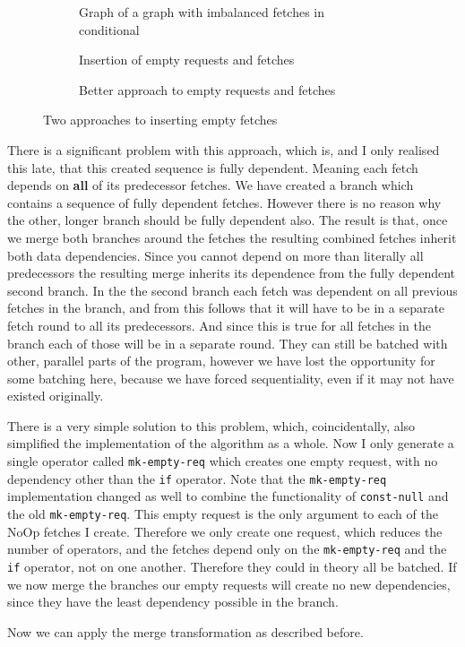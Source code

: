 \begin{figure}[h]
  \begin{subfigure}{\textwidth}
      \caption{Graph of a graph with imbalanced fetches in conditional}
      \label{fig:if-insert-empty-parallel-before}
  \end{subfigure}
  \begin{subfigure}[b]{0.5\textwidth}
      \caption{Insertion of empty requests and fetches}
      \label{fig:if-insert-empty-parallel-after}
  \end{subfigure}
  \begin{subfigure}[b]{.5\textwidth}
      \caption{Better approach to empty requests and fetches}
      \label{if-insert-empty-better-after-insert}
  \end{subfigure}
  \caption{Two approaches to inserting empty fetches}
\end{figure}


There is a significant problem with this approach, which is, and I only realised this late, that this created sequence is fully dependent.
Meaning each fetch depends on \textbf{all} of its predecessor fetches.
We have created a branch which contains a sequence of fully dependent fetches.
However there is no reason why the other, longer branch should be fully dependent also.
The result is that, once we merge both branches around the fetches the resulting combined fetches inherit both data dependencies.
Since you cannot depend on more than literally all predecessors the resulting merge inherits its dependence from the fully dependent second branch.
In the the second branch each fetch was dependent on all previous fetches in the branch, and from this follows that it will have to be in a separate fetch round to all its predecessors.
And since this is true for all fetches in the branch each of those will be in a separate round.
They can still be batched with other, parallel parts of the program, however we have lost the opportunity for some batching here, because we have forced sequentiality, even if it may not have existed originally.

There is a very simple solution to this problem, which, coincidentally, also simplified the implementation of the algorithm as a whole.
Now I only generate a single operator called \texttt{mk-empty-req} which creates one empty request, with no dependency other than the \texttt{if} operator.
Note that the \texttt{mk-empty-req} implementation changed as well to combine the functionality of \texttt{const-null} and the old \texttt{mk-empty-req}.
This empty request is the only argument to each of the NoOp fetches I create.
Therefore we only create one request, which reduces the number of operators, and the fetches depend only on the \texttt{mk-empty-req} and the \texttt{if} operator, not on one another.
Therefore they could in theory all be batched.
If we now merge the branches our empty requests will create no new dependencies, since they have the least dependency possible in the branch.



Now we can apply the merge transformation as described before.
